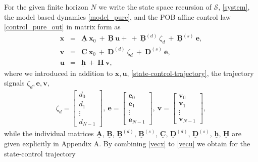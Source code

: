 \documentclass[letterpaper,11pt]{article}
\newcommand{\AR}[2]{\left[\begin{array}{#1}#2\end{array}\right]}
\begin{document}
For the given finite horizon $N$ we write the state space recursion of $\mathcal{S}$, \eqref{system}, the model based dynamics \eqref{model_pure}, 
and the POB affine control law \eqref{control_pure_out} in matrix form as 
\begin{eqnarray}
\label{vecx}
\mathbf{x} & = & \underline{\mathbf{A}} ~ \mathbf{x}_0 ~ + ~ \underline{\mathbf{B}} ~ \mathbf{u} + ~ + ~ \underline{\mathbf{B}}^{(d)} ~ \zeta_d ~ + ~ \underline{\mathbf{B}}^{(s)} ~ 
\mathbf{e}, \\
\label{vecv}
\mathbf{v} & = &  \underline{\mathbf{C}}~ \mathbf{x}_0 ~ + ~ \underline{\mathbf{D}}^{(d)} ~ \zeta_d~+~ \underline{\mathbf{D}}^{(s)} ~ \mathbf{e}, \\
\label{vecu}
\mathbf{u} & = &  \underline{\mathbf{h}}~ + ~ \underline{\mathbf{H}} ~  \mathbf{v},
\end{eqnarray}
where we introduced in addition to $\mathbf{x}, \mathbf{u}$, \eqref{state-control-trajectory}, the trajectory 
signals $\zeta_d, \mathbf{e}, \mathbf{v},$
\begin{eqnarray*}
\zeta_d  =  \AR{c}{d_0 \\ d_1 \\ \vdots \\ d_{N-1}}, ~
\mathbf{e}  =   \AR{c}{\mathbf{e}_0 \\ \mathbf{e}_1 \\ \vdots \\ \mathbf{e}_{N-1}},~
\mathbf{v}  =  
 \AR{c}{\mathbf{v}_0 \\ \mathbf{v}_1 \\ \vdots \\ \mathbf{v}_{N-1}}, 
\end{eqnarray*}
while the individual matrices  $\underline{\mathbf{A}}$, $\underline{\mathbf{B}}$, 
$\underline{\mathbf{B}}^{(d)}$, $\underline{\mathbf{B}}^{(s)}$, $\underline{\mathbf{C}}$, 
$\underline{\mathbf{D}}^{(d)}$, $\underline{\mathbf{D}}^{(s)}$, $\underline{\mathbf{h}}$, $\underline{\mathbf{H}}$ are given explicitly in Appendix A.
By combining \eqref{vecx} to \eqref{vecu} we obtain for the state-control trajectory 
\end{document}
